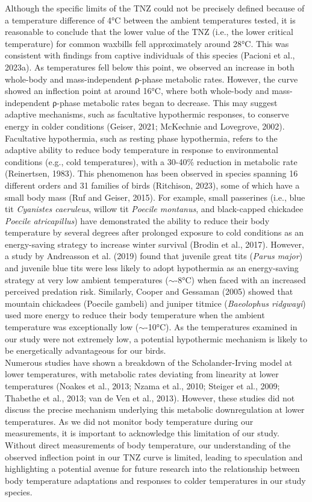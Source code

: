 \documentclass[10pt, twoside]{book} %
\begin{document}
Although the specific limits of the TNZ could not be precisely defined because of a temperature difference of 4°C between the ambient temperatures tested, it is reasonable to conclude that the lower value of the TNZ (i.e., the lower critical temperature) for common waxbills fell approximately around 28°C. This was consistent with findings from captive individuals of this species (Pacioni et al., 2023a). As temperatures fell below this point, we observed an increase in both whole-body and mass-independent ρ-phase metabolic rates. However, the curve showed an inflection point at around 16°C, where both whole-body and mass-independent ρ-phase metabolic rates began to decrease. This may suggest adaptive mechanisms, such as facultative hypothermic responses, to conserve energy in colder conditions (Geiser, 2021; McKechnie and Lovegrove, 2002). Facultative hypothermia, such as resting phase hypothermia, refers to the adaptive ability to reduce body temperature in response to environmental conditions (e.g., cold temperatures), with a 30-40\% reduction in metabolic rate (Reinertsen, 1983). This phenomenon has been observed in species spanning 16 different orders and 31 families of birds (Ritchison, 2023), some of which have a small body mass (Ruf and Geiser, 2015). For example, small passerines (i.e., blue tit \textit{Cyanistes caeruleus}, willow tit \textit{Poecile montanus}, and black-capped chickadee \textit{Poecile atricapillus}) have demonstrated the ability to reduce their body temperature by several degrees after prolonged exposure to cold conditions as an energy-saving strategy to increase winter survival (Brodin et al., 2017). However, a study by Andreasson et al. (2019) found that juvenile great tits (\textit{Parus major}) and juvenile blue tits were less likely to adopt hypothermia as an energy-saving strategy at very low ambient temperatures ($\sim$-8°C) when faced with an increased perceived predation risk. Similarly, Cooper and Gessaman (2005) showed that mountain chickadees (Poecile gambeli) and juniper titmice (\textit{Baeolophus ridgwayi}) used more energy to reduce their body temperature when the ambient temperature was exceptionally low ($\sim$-10°C). As the temperatures examined in our study were not extremely low, a potential hypothermic mechanism is likely to be energetically advantageous for our birds.\\

Numerous studies have shown a breakdown of the Scholander-Irving model at lower temperatures, with metabolic rates deviating from linearity at lower temperatures (Noakes et al., 2013; Nzama et al., 2010; Steiger et al., 2009; Thabethe et al., 2013; van de Ven et al., 2013). However, these studies did not discuss the precise mechanism underlying this metabolic downregulation at lower temperatures. As we did not monitor body temperature during our measurements, it is important to acknowledge this limitation of our study. Without direct measurements of body temperature, our understanding of the observed inflection point in our TNZ curve is limited, leading to speculation and highlighting a potential avenue for future research into the relationship between body temperature adaptations and responses to colder temperatures in our study species.\\
\end{document}
